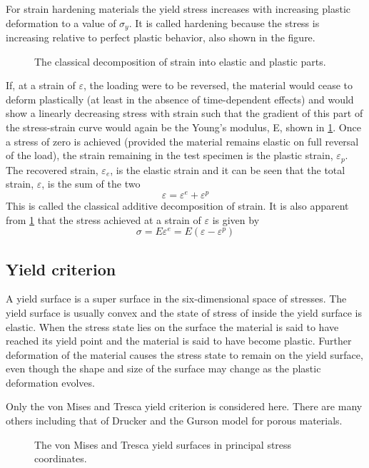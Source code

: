 For strain hardening materials the yield stress increases with increasing plastic deformation to a value of $\sigma_y$.
It is called hardening because the stress is increasing relative to perfect plastic behavior, also shown in the figure.
\begin{figure}[!htp]
\centering{}
\caption{The classical decomposition of strain into elastic and plastic parts.}
\label{Fig:Strain_decomposition}
\end{figure}
If, at a strain of $\varepsilon$, the loading were to be reversed, the material would cease to deform plastically (at least in the absence of time-dependent effects) and would show a linearly decreasing stress with strain such that the gradient of this part of the stress-strain curve would again be the Young's modulus, E, shown in \ref{Fig:Strain_decomposition}.
Once a stress of zero is achieved (provided the material remains elastic on full reversal of the load), the strain remaining in the test specimen is the plastic strain, $\varepsilon_p$.
The recovered strain, $\varepsilon_e$, is the elastic strain and it can be seen that the total strain, $\varepsilon$, is the sum of the two
\begin{equation}
\varepsilon = \varepsilon^e + \varepsilon^p
\end{equation}
This is called the classical additive decomposition of strain.
It is also apparent from \ref{Fig:Strain_decomposition} that the stress achieved at a strain of $\varepsilon$ is given by
\begin{equation}
\sigma = E\varepsilon^e = E(\varepsilon - \varepsilon^p)
\end{equation}

\subsection{Yield criterion}
A yield surface is a super surface in the six-dimensional space of stresses.
The yield surface is usually convex and the state of stress of inside the yield surface is elastic.
When the stress state lies on the surface the material is said to have reached its yield point and the material is said to have become plastic.
Further deformation of the material causes the stress state to remain on the yield surface, even though the shape and size of the surface may change as the plastic deformation evolves.

Only the von Mises and Tresca yield criterion is considered here.
There are many others including that of Drucker and the Gurson model for porous materials.
\begin{figure}[!htp]
\centering{}
\caption{The von Mises and Tresca yield surfaces in principal stress coordinates.}
\label{Fig:YieldSurface3D}
\end{figure}

